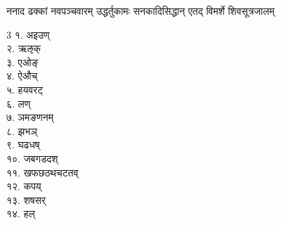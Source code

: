 \Large
\sectionmark{\mbox{}}



\closesection

\clearpage
\begin{center}

{ननाद ढक्कां नवपञ्चवारम्}
{उद्धर्तुकामः सनकादिसिद्धान्}
{एतद् विमर्शे शिवसूत्रजालम्}
\end{center}
 \setlength{\columnseprule}{0pt}

\begin{multicols}{3}
१. अइउण्\\
२. ऋऌक्\\
३. एओङ्\\
४. ऐऔच्\\
५. हयवरट्\\
६. लण्\\
७. ञमङणनम्\\
८. झभञ्\\
९. घढधष्\\
१०. जबगडदश्\\
११. खफछ\-ठथ\-चट\-तव्\\
१२. कपय्\\
१३. शषसर्\\
१४. हल्
\end{multicols}

